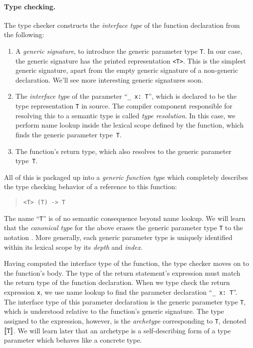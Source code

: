 \documentclass[../generics]{subfiles}
\begin{document}
\paragraph{Type checking.} The type checker constructs the \emph{interface type} of the function declaration from the following:
\begin{enumerate}
\item A \emph{generic signature}, to introduce the generic parameter type \texttt{T}. In our case, the generic signature has the printed representation \texttt{<T>}. This is the simplest generic signature, apart from the empty generic signature of a non-generic declaration. We'll see more interesting generic signatures soon.

\item The \emph{interface type} of the parameter ``\verb|_ x: T|'', which is declared to be the type representation \texttt{T} in source. The compiler component responsible for resolving this to a semantic type is called \emph{type resolution}. In this case, we perform name lookup inside the lexical scope defined by the function, which finds the generic parameter type~\texttt{T}.

\item The function's return type, which also resolves to the generic parameter type~\texttt{T}.
\end{enumerate}
All of this is packaged up into a \emph{generic function type} which completely describes the type checking behavior of a reference to this function:
\begin{quote}
\begin{verbatim}
<T> (T) -> T
\end{verbatim}
\end{quote}
The name ``\texttt{T}'' is of no semantic consequence beyond name lookup. We will learn that the \emph{canonical type} for the above erases the generic parameter type \texttt{T} to the notation . More generally, each generic parameter type is uniquely identified within its lexical scope by its \emph{depth} and \emph{index}.

Having computed the interface type of the function, the type checker moves on to the function's body. The type of the return statement's expression must match the return type of the function declaration. When we type check the return expression \texttt{x}, we use name lookup to find the parameter declaration ``\verb|_ x: T|''. The interface type of this parameter declaration is the generic parameter type \texttt{T}, which is understood relative to the function's generic signature. The type assigned to the expression, however, is the \emph{archetype} corresponding to \texttt{T}, denoted $[\![\texttt{T}]\!]$. We will learn later that an archetype is a self-describing form of a type parameter which behaves like a concrete type.
\end{document}
